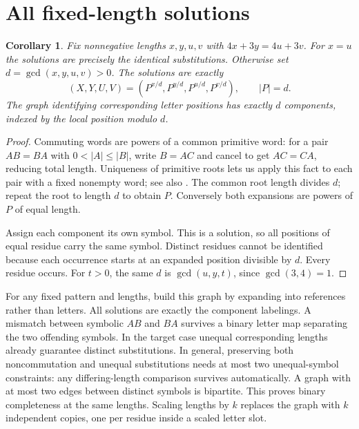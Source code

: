 \documentclass[11pt]{article}
\newtheorem{corollary}[theorem]{Corollary}
\theoremstyle{remark}\newtheorem*{remark}{Remark}
\begin{document}
\section{All fixed-length solutions}
\begin{corollary}\label{gcd}
Fix nonnegative lengths \(x,y,u,v\) with \(4x+3y=4u+3v\). For \(x=u\) the solutions are precisely the identical substitutions. Otherwise set \(d=\gcd(x,y,u,v)>0\). The solutions are exactly
\[
 (X,Y,U,V)=(P^{x/d},P^{y/d},P^{u/d},P^{v/d}),\qquad |P|=d .
\]
The graph identifying corresponding letter positions has exactly \(d\) components, indexed by the local position modulo \(d\).
\end{corollary}
\begin{proof}
Commuting words are powers of a common primitive word: for a pair \(AB=BA\) with \(0<|A|\le |B|\), write \(B=AC\) and cancel to get \(AC=CA\), reducing total length. Uniqueness of primitive roots lets us apply this fact to each pair with a fixed nonempty word; see also \cite[Lemma 1]{hs}. The common root length divides \(d\); repeat the root to length \(d\) to obtain \(P\). Conversely both expansions are powers of \(P\) of equal length.

Assign each component its own symbol. This is a solution, so all positions of equal residue carry the same symbol. Distinct residues cannot be identified because each occurrence starts at an expanded position divisible by \(d\). Every residue occurs. For \(t>0\), the same \(d\) is \(\gcd(u,y,t)\), since \(\gcd(3,4)=1\).
\end{proof}

For any fixed pattern and lengths, build this graph by expanding into references rather than letters. All solutions are exactly the component labelings. A mismatch between symbolic \(AB\) and \(BA\) survives a binary letter map separating the two offending symbols. In the target case unequal corresponding lengths already guarantee distinct substitutions. In general, preserving both noncommutation and unequal substitutions needs at most two unequal-symbol constraints: any differing-length comparison survives automatically. A graph with at most two edges between distinct symbols is bipartite. This proves binary completeness at the same lengths. Scaling lengths by \(k\) replaces the graph with \(k\) independent copies, one per residue inside a scaled letter slot.
\end{document}
